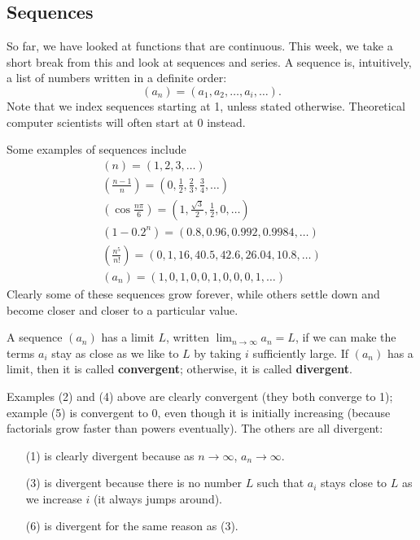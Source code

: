 


\subsection*{Sequences}
So far, we have looked at functions that are continuous. This week, we take a short break from this and look at sequences and series. A sequence
is, intuitively, a list of numbers written in a definite order:
\begin{displaymath}
  (a_n) = (a_1, a_2, \dots, a_i, \dots).
\end{displaymath}
Note that we index sequences starting at 1, unless stated otherwise. Theoretical computer scientists will often start at 0 instead.

Some examples of sequences include
\begin{gather}
  \left(n\right) = (1,2,3,\dots) \text{}\\
  \left(\frac{n-1}{n}\right) = \left(0,\frac{1}{2},\frac{2}{3},\frac{3}{4},\dots\right)\\
  \left(\cos \frac{n\pi}{6} \right) = \left(1, \frac{\sqrt{3}}{2}, \frac{1}{2}, 0, \dots\right)\\
  \left(1 - 0.2^n \right) = \left(0.8, 0.96,0.992,0.9984,\dots \right)\\
  \left(\frac{n^5}{n!}\right) = \left(0, 1, 16,40.5,42.6,26.04,10.8,\dots\right)\\
  \left( a_n \right) = \left(1,0,1,0,0,1,0,0,0,1,\dots\right)
\end{gather}
Clearly some of these sequences grow forever, while others settle down and become closer and closer to a particular value.
\begin{defn}
  A sequence $ (a_n) $ has a limit $ L $, written $ \lim_{n\to\infty} a_n = L $, if we can make the terms $ a_i $ stay as close as we like
  to $ L $ by taking $ i $ sufficiently large. If $ (a_n) $ has a limit, then it is called \textbf{convergent}; otherwise, it is
  called \textbf{divergent}.
\end{defn}

Examples (2) and (4) above are clearly convergent (they both converge to 1); example (5) is convergent to 0, even though it is initially
increasing (because factorials grow faster than powers eventually). The others are all divergent:
\begin{enumerate}
  \item[(1)] is clearly divergent because as $ n \to \infty $, $ a_n \to \infty $.
  \item[(3)] is divergent because there is no number $ L $ such that $ a_i $ stays close to $ L $ as we increase $ i $ (it always jumps around).
  \item[(6)] is divergent for the same reason as (3).
\end{enumerate}

